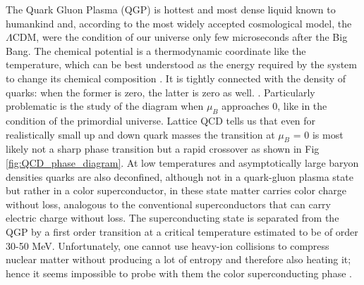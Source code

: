 \documentclass[12pt,a4paper]{book}
\begin{document}
	The Quark Gluon Plasma (QGP) is hottest and most dense liquid known to humankind and, according to the most widely accepted cosmological model, the $\Lambda$CDM, were the condition of our universe only few microseconds after the Big Bang. The chemical potential is a thermodynamic coordinate like the temperature, which can be best understood as the energy required by the system to change its chemical composition . It is tightly connected with the density of quarks: when the former is zero, the latter is zero as well. \cite{QCDPhase-Diagram}. Particularly problematic is the study of the diagram when $\mu_B$ approaches 0, like in the condition of the primordial universe. Lattice QCD tells us that even for realistically small up and down quark masses the transition at $\mu_B$ = 0 is most likely not a sharp phase transition but a rapid crossover as shown in Fig \ref{fig:QCD_phase_diagram}.  At low temperatures and asymptotically large baryon densities quarks are also deconfined, although not in a quark-gluon plasma state but rather in a
	color superconductor, in these state matter carries color charge without loss, analogous to the conventional superconductors that can carry electric charge without loss. The superconducting state is separated from the QGP by a first order transition at a critical temperature estimated to be of order 30-50 MeV.  Unfortunately, one cannot use heavy-ion collisions to compress nuclear matter without producing a lot of entropy and therefore also heating it; hence it seems impossible to probe with them the color superconducting phase \cite{heinz2004conceptsheavyionphysics}.
	
\end{document}
